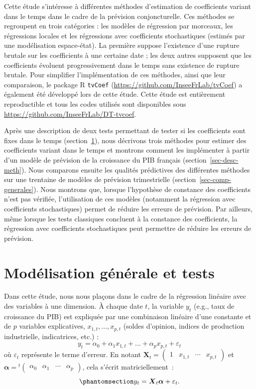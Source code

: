 \documentclass[
  a4paper,
  DIV=11,
  numbers=noendperiod,
  french]{scrartcl}
\newcommand\1{{\mathds 1}}
\newcommand{\transp}[1]{{}^t\!#1}
\newcommand{\bf}[1]{{\boldsymbol #1}}
\theoremstyle{remark}
\begin{document}
Cette étude s'intéresse à différentes méthodes d'estimation de
coefficients variant dans le temps dans le cadre de la prévision
conjoncturelle. Ces méthodes se regroupent en trois catégories : les
modèles de régression par morceaux, les régressions locales et les
régressions avec coefficients stochastiques (estimés par une
modélisation espace-état). La première suppose l'existence d'une rupture
brutale sur les coefficients à une certaine date ; les deux autres
supposent que les coefficients évoluent progressivement dans le temps
sans existence de rupture brutale. Pour simplifier l'implémentation de
ces méthodes, ainsi que leur comparaison, le package R \texttt{tvCoef}
(\url{https://github.com/InseeFrLab/tvCoef}) a également été développé
lors de cette étude. Cette étude est entièrement reproductible et tous
les codes utilisés sont disponibles sous
\url{https://github.com/InseeFrLab/DT-tvcoef}.

Après une description de deux tests permettant de tester si les
coefficients sont fixes dans le temps (section~\ref{sec-tests}), nous
décrivons trois méthodes pour estimer des coefficients variant dans le
temps et montrons comment les implémenter à partir d'un modèle de
prévision de la croissance du PIB français
(section~\ref{sec-desc-meth}). Nous comparons ensuite les qualités
prédictives des différentes méthodes sur une trentaine de modèles de
prévision trimestrielle (section~\ref{sec-comp-generales}). Nous
montrons que, lorsque l'hypothèse de constance des coefficients n'est
pas vérifiée, l'utilisation de ces modèles (notamment la régression avec
coefficients stochastiques) permet de réduire les erreurs de prévision.
Par ailleurs, même lorsque les tests classiques concluent à la constance
des coefficients, la régression avec coefficients stochastiques peut
permettre de réduire les erreurs de prévision.

\section{Modélisation générale et tests}\label{sec-tests}

Dans cette étude, nous nous plaçons dans le cadre de la régression
linéaire avec des variables à une dimension. À chaque date \(t\), la
variable \(y_t\) (e.g., taux de croissance du PIB) est expliquée par une
combinaison linéaire d'une constante et de \(p\) variables explicatives,
\(x_{1,t},\dots,x_{p,t}\) (soldes d'opinion, indices de production
industrielle, indicatrices, etc.) : \[
y_t=\alpha_{0}+\alpha_{1} x_{1,t}+\dots+\alpha_{p} x_{p,t} +\varepsilon_t 
\] où \(\varepsilon_t\) représente le terme d'erreur. En notant
\({\bf X}_t=\begin{pmatrix}1 & x_{1,t} &\cdots & x_{p,t} \end{pmatrix}\)
et
\({\bf \alpha}=\transp{\begin{pmatrix}\alpha_0 & \alpha_1 &\cdots & \alpha_p \end{pmatrix}}\),
cela s'écrit matriciellement~:
\begin{equation}\phantomsection\label{eq-mod-fixe}{
y_t={\bf X_t} \bf\alpha +\varepsilon_t.
}\end{equation}
\end{document}
